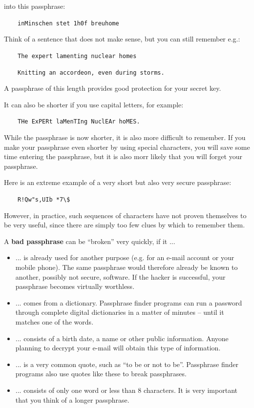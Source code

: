 \documentclass[a4paper,11pt,oneside,openright,titlepage]{scrbook}
\newcommand{\Email}{e-mail}
\begin{document}
into this passphrase:

$\qquad$\verb-inMinschen stet 1h0f breuhome-

Think of a sentence that does not make sense, but you can still remember
e.g.:

$\qquad$\verb-The expert lamenting nuclear homes-

$\qquad$\verb-Knitting an accordeon, even during storms.-

A passphrase of this length provides good protection for your
secret key.

It can also be shorter if you use capital letters,
for example:

$\qquad$\verb-THe ExPERt laMenTIng NuclEAr hoMES.-

While the passphrase is now shorter, it is also more difficult to
remember. If you make your passphrase even shorter by using special
characters, you will save some time entering the passphrase, but it is
also morr likely that you will forget your passphrase.

Here is an extreme example of a very short but also very secure
passphrase:

$\qquad$\verb-R!Qw"s,UIb *7\$-

However, in practice, such sequences of characters have not proven
themselves to be very useful, since there are simply too few clues by
which to remember them.


\clearpage
A \textbf{bad passphrase} can be ``broken'' very quickly, if it ...

\begin{itemize}
    \item ... is already used for another purpose (e.g. for an \Email{} account or your mobile phone). The
        same passphrase would therefore already be known to another,
        possibly not secure, software. If the hacker is successful,
        your passphrase becomes virtually worthless.

    \item ... comes from a dictionary. Passphrase finder programs can
        run a password through complete digital dictionaries in a
        matter of minutes -- until it matches one of the words.

    \item ... consists of a birth date, a name or other public
        information. Anyone planning to decrypt your
       \Email{} will obtain this type of
        information.

    \item ... is a very common quote, such as ``to be or not to be''.
        Passphrase finder programs also use quotes like these to break
        passphrases.

    \item ... consists of only one word or less than 8 characters. It
        is very important that you think of a longer passphrase.
\end{itemize}
\end{document}
